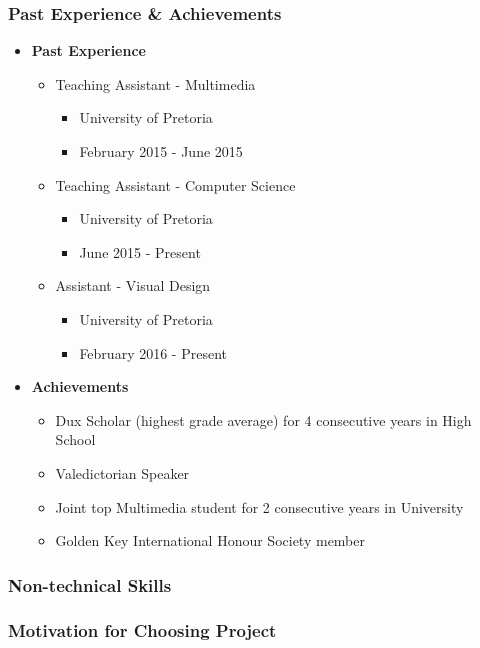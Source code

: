 \documentclass{article}
\begin{document}
	\subsubsection{Past Experience \& Achievements}
		\begin{itemize}
			\item \textbf{Past Experience}
			\begin{itemize}
				\item Teaching Assistant - Multimedia
				\begin{itemize}
					\item University of Pretoria
					\item February 2015 - June 2015
				\end{itemize}
				\item Teaching Assistant - Computer Science
				\begin{itemize}
					\item University of Pretoria
					\item June 2015 - Present
				\end{itemize}
				\item Assistant - Visual Design
				\begin{itemize}
					\item University of Pretoria
					\item February 2016 - Present
				\end{itemize}
			\end{itemize}
			\item \textbf{Achievements}
				\begin{itemize}
					\item Dux Scholar (highest grade average) for 4 consecutive years in High School
					\item Valedictorian Speaker
					\item Joint top Multimedia student for 2 consecutive years in University
					\item Golden Key International Honour Society member
				\end{itemize}
		\end{itemize}
	\subsubsection{Non-technical Skills}
	\subsubsection{Motivation for Choosing Project}
\end{document}
